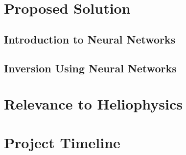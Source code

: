 \documentclass{article}
\begin{document}
	\section{Proposed Solution}
		\subsection{Introduction to Neural Networks}
		\subsection{Inversion Using Neural Networks}
	\section{Relevance to Heliophysics}
	\section{Project Timeline}
	

	\printbibliography

	
\end{document}
